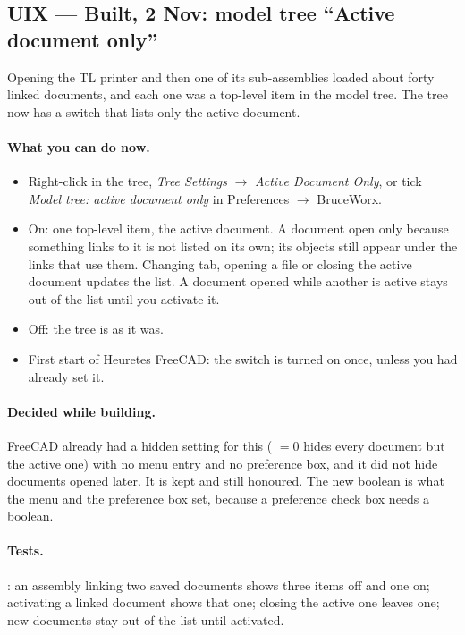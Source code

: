 \subsection{UIX --- Built, 2 Nov: model tree ``Active document only''}\label{sec:tree-active-only-built}

Opening the TL printer and then one of its sub-assemblies loaded about forty linked documents, and each one was a
top-level item in the model tree. The tree now has a switch that lists only the active document.

\paragraph{What you can do now.}
\begin{itemize}[nosep]
  \item Right-click in the tree, \emph{Tree Settings} $\rightarrow$ \emph{Active Document Only}, or tick
        \emph{Model tree: active document only} in Preferences $\rightarrow$ BruceWorx.
  \item On: one top-level item, the active document. A document open only because something links to it is not
        listed on its own; its objects still appear under the links that use them. Changing tab, opening a file or
        closing the active document updates the list. A document opened while another is active stays out of the list
        until you activate it.
  \item Off: the tree is as it was.
  \item First start of Heuretes FreeCAD: the switch is turned on once, unless you had already set it.
\end{itemize}

\paragraph{Decided while building.}
FreeCAD already had a hidden setting for this ( $=0$ hides every document but the active
one) with no menu entry and no preference box, and it did not hide documents opened later. It is kept and still
honoured. The new boolean  is what the menu and the preference box set, because a
preference check box needs a boolean.

\paragraph{Tests.} : an assembly linking two saved documents shows three items
off and one on; activating a linked document shows that one; closing the active one leaves one; new documents stay
out of the list until activated.
